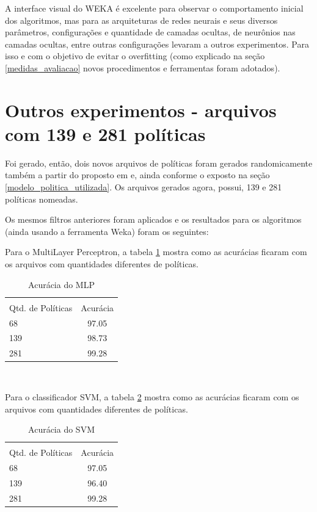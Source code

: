A interface visual do WEKA é excelente para observar o comportamento inicial dos algoritmos, mas para as arquiteturas de redes neurais e seus diversos parâmetros, configurações e quantidade de camadas ocultas, de neurônios nas camadas ocultas, entre outras configurações levaram a outros experimentos. Para isso e com o objetivo de evitar o overfitting (como explicado na seção \ref{medidas_avaliacao} novos procedimentos e ferramentas foram adotados).

\section{Outros experimentos - arquivos com 139 e 281 políticas}
Foi gerado, então, dois novos arquivos de políticas foram gerados randomicamente também a partir do proposto em \cite{sarkis2017} e, ainda conforme o exposto na seção \ref{modelo_politica_utilizada}. Os arquivos gerados agora, possui, 139  e 281 políticas nomeadas.

Os mesmos filtros anteriores foram aplicados e os resultados para os algoritmos (ainda usando a ferramenta Weka) foram os seguintes:

Para o MultiLayer Perceptron, a tabela \ref{tab:MLP_acuracia} mostra como as acurácias ficaram com os arquivos com quantidades diferentes de políticas.

\begin{table}[h!]
	\centering
	\caption{Acurácia do MLP}
	\label{tab:MLP_acuracia}
	\vspace{0.3cm}
	\begin{tabular}{p{6cm}c}
		\hline\\
		Qtd. de Políticas	& Acurácia  \\[10pt] 
		\hline
		68 					& 97.05    	\\
		139			     	& 98.73     \\
		281					& 99.28		\\
		\hline
	\end{tabular}
	\\[6pt]		
\end{table}

Para o classificador SVM, a tabela \ref{tab:SVM_acuracia} mostra como as acurácias ficaram com os arquivos com quantidades diferentes de políticas.

\begin{table}[h!]
	\centering
	\caption{Acurácia do SVM}
	\label{tab:SVM_acuracia}
	\vspace{0.3cm}
	\begin{tabular}{p{6cm}c}
		\hline\\
		Qtd. de Políticas	& Acurácia  \\[10pt] 
		\hline
		68 					& 97.05    	\\
		139			     	& 96.40     \\
		281					& 99.28		\\
		\hline
	\end{tabular}
	\\[6pt]		
\end{table}

